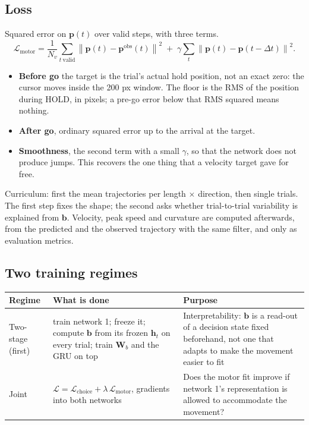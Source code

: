 \documentclass[11pt,a4paper]{article}
\newcommand{\vect}[1]{\bm{#1}}
\begin{document}
\subsection{Loss}

Squared error on $\vect{p}(t)$ over valid steps, with three terms.
\begin{equation}
  \mathcal{L}_{\mathrm{motor}} = \frac{1}{N_v}\sum_{t\ \mathrm{valid}}
  \left\| \vect{p}(t) - \vect{p}^{\mathrm{obs}}(t) \right\|^2
  \;+\; \gamma \sum_{t} \left\| \vect{p}(t) - \vect{p}(t - \Delta t) \right\|^2 .
  \label{eq:mot-loss}
\end{equation}
\begin{itemize}[leftmargin=*]
\item \textbf{Before go} the target is the trial's actual hold position, not an exact
      zero: the cursor moves inside the 200 px window. The floor is the RMS of the
      position during HOLD, in pixels; a pre-go error below that RMS squared means
      nothing.
\item \textbf{After go}, ordinary squared error up to the arrival at the target.
\item \textbf{Smoothness}, the second term with a small $\gamma$, so that the network
      does not produce jumps. This recovers the one thing that a velocity target gave
      for free.
\end{itemize}
Curriculum: first the mean trajectories per length $\times$ direction, then single
trials. The first step fixes the shape; the second asks whether trial-to-trial
variability is explained from $\vect{b}$. Velocity, peak speed and curvature are
computed afterwards, from the predicted and the observed trajectory with the same filter,
and only as evaluation metrics.

\subsection{Two training regimes}

\begin{table}[H]
  \centering\small
  \begin{tabular}{lp{5.5cm}p{6.5cm}}
    \toprule
    Regime & What is done & Purpose \\
    \midrule
    Two-stage (first) & train network 1; freeze it; compute $\vect{b}$ from its frozen $\vect{h}_t$ on every trial; train $\vect{W}_b$ and the GRU on top & Interpretability: $\vect{b}$ is a read-out of a decision state fixed beforehand, not one that adapts to make the movement easier to fit \\
    Joint & $\mathcal{L} = \mathcal{L}_{\mathrm{choice}} + \lambda\,\mathcal{L}_{\mathrm{motor}}$, gradients into both networks & Does the motor fit improve if network 1's representation is allowed to accommodate the movement? \\
    \bottomrule
  \end{tabular}
\end{table}
\end{document}
